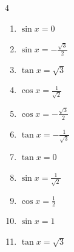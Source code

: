 \begin{multicols}{4}
\begin{enumerate}
\columnbreak %

  \item $\displaystyle \sin{x}  = 0$

        \phantom{$\displaystyle x = 0 , \pi$}

  \item $\displaystyle \sin{x}  = -\frac{\sqrt{3}}{2}$


  \item $\displaystyle \tan{x}  = \sqrt{3}$


  \item $\displaystyle \cos{x}  = \frac{1}{\sqrt{2}}$


  \item $\displaystyle \cos{x}  = -\frac{\sqrt{3}}{2}$


  \item $\displaystyle \tan{x}  = -\frac{1}{\sqrt{3}}$


  \item $\displaystyle \tan{x}  = 0$

        \phantom{$\displaystyle x = 0 , \pi$}

  \item $\displaystyle \sin{x}  = \frac{1}{\sqrt{2}}$


  \item $\displaystyle \cos{x}  = \frac{1}{2}$


  \item $\displaystyle \sin{x}  = 1$


  \item $\displaystyle \tan{x}  = \sqrt{3}$



\end{enumerate}
\end{multicols}
